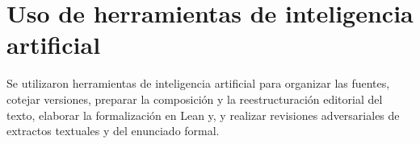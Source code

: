 \section*{Uso de herramientas de inteligencia artificial}
{}

Se utilizaron herramientas de inteligencia artificial para organizar las fuentes, cotejar
versiones, preparar la composición y la reestructuración editorial del texto\ifverificacionLean,
elaborar la formalización en Lean y\else, y\fi{} realizar revisiones adversariales de extractos
textuales\ifverificacionLean{} y del enunciado formal\fi.
